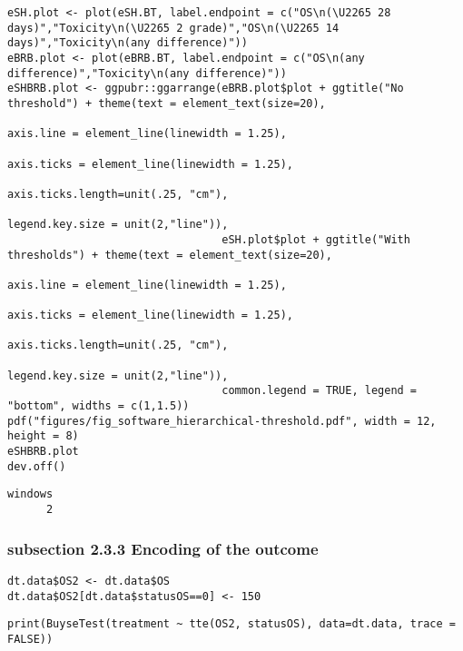 \documentclass[12pt]{article}
\begin{document}
\lstset{language=r,label= ,caption= ,captionpos=b,numbers=none}
\begin{lstlisting}
eSH.plot <- plot(eSH.BT, label.endpoint = c("OS\n(\U2265 28 days)","Toxicity\n(\U2265 2 grade)","OS\n(\U2265 14 days)","Toxicity\n(any difference)"))
eBRB.plot <- plot(eBRB.BT, label.endpoint = c("OS\n(any difference)","Toxicity\n(any difference)")) 
eSHBRB.plot <- ggpubr::ggarrange(eBRB.plot$plot + ggtitle("No threshold") + theme(text = element_text(size=20), 
                                                                                  axis.line = element_line(linewidth = 1.25),
                                                                                  axis.ticks = element_line(linewidth = 1.25),
                                                                                  axis.ticks.length=unit(.25, "cm"),
                                                                                  legend.key.size = unit(2,"line")),
                                 eSH.plot$plot + ggtitle("With thresholds") + theme(text = element_text(size=20), 
                                                                                    axis.line = element_line(linewidth = 1.25),
                                                                                    axis.ticks = element_line(linewidth = 1.25),
                                                                                    axis.ticks.length=unit(.25, "cm"),
                                                                                    legend.key.size = unit(2,"line")),
                                 common.legend = TRUE, legend = "bottom", widths = c(1,1.5))
pdf("figures/fig_software_hierarchical-threshold.pdf", width = 12, height = 8)
eSHBRB.plot
dev.off()
\end{lstlisting}

\begin{verbatim}
windows 
      2
\end{verbatim}

\subsubsection{subsection 2.3.3 Encoding of the outcome}
\label{sec:org976784d}
\lstset{language=r,label= ,caption= ,captionpos=b,numbers=none}
\begin{lstlisting}
dt.data$OS2 <- dt.data$OS
dt.data$OS2[dt.data$statusOS==0] <- 150
\end{lstlisting}

\lstset{language=r,label= ,caption= ,captionpos=b,numbers=none}
\begin{lstlisting}
print(BuyseTest(treatment ~ tte(OS2, statusOS), data=dt.data, trace = FALSE))
\end{lstlisting}
\end{document}
